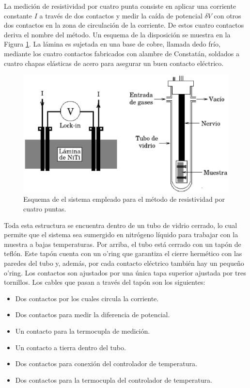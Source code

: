\documentclass[12pt]{article}
\theoremstyle{definition}
\theoremstyle{remark}
\begin{document}
{La medición de resistividad por cuatro punta consiste en aplicar una corriente constante $I$ a través de dos contactos y medir  la caída de potencial $\delta V$ con otros dos contactos en la zona de circulación de la corriente. De estos cuatro contactos deriva el nombre del método. Un esquema de la disposición se muestra en la Figura \ref{4puntas}. La lámina es sujetada en una base de cobre, llamada dedo frío, mediante los cuatro contactos fabricados con alambre de Constatán, soldados a cuatro chapas elásticas de acero para asegurar un buen contacto eléctrico.

 \begin{figure}[H]
 	\centering
	\includegraphics[scale=0.7]{img/resistividad.eps}
 	\caption{Esquema de el sistema empleado para el método de resistividad por cuatro puntas.}
	\label{4puntas}
\end{figure} 

Toda esta estructura se encuentra dentro de un tubo de vidrio cerrado, lo cual permite que el sistema sea sumergido en nitrógeno líquido para trabajar con la muestra a bajas temperaturas. Por arriba, el tubo está cerrado con un tapón de teflón. Este tapón cuenta con un o'ring que garantiza el cierre hermético con las paredes del tubo y, además, por cada contacto eléctrico también hay un pequeño o'ring. Los contactos son ajustados por una única tapa superior ajustada por tres tornillos. Los cables que pasan a través del tapón son los siguientes:
\begin{itemize}
\item Dos contactos por los cuales circula la corriente.
\item Dos contactos para medir la diferencia de potencial.
\item Un contacto para la termocupla de medición.
\item Un contacto a tierra dentro del tubo.
\item Dos contactos para conexión del controlador de temperatura.
\item Dos contactos para la termocupla del controlador de temperatura.
\end{itemize}


}
\end{document}
